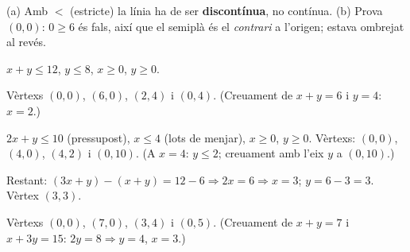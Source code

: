 \begin{solucions}
\begin{sollist}
  \item (a) Amb $<$ (estricte) la línia ha de ser \textbf{discontínua}, no contínua. \quad
        (b) Prova $(0,0)$: $0\ge 6$ és fals, així que el semiplà és el \emph{contrari}
        a l'origen; estava ombrejat al revés.
  \item $x+y\le 12$, \;$y\le 8$, \;$x\ge 0$, \;$y\ge 0$.
  \item Vèrtexs $(0,0)$, $(6,0)$, $(2,4)$ i $(0,4)$. (Creuament de $x+y=6$ i $y=4$:
        $x=2$.)
  \item $2x+y\le 10$ (pressupost), $x\le 4$ (lots de menjar), $x\ge 0$, $y\ge 0$.
        Vèrtexs: $(0,0)$, $(4,0)$, $(4,2)$ i $(0,10)$. (A $x=4$: $y\le 2$;
        creuament amb l'eix $y$ a $(0,10)$.)
  \item Restant: $(3x+y)-(x+y)=12-6\Rightarrow 2x=6\Rightarrow x=3$; $y=6-3=3$. Vèrtex
        $(3,3)$.
  \item Vèrtexs $(0,0)$, $(7,0)$, $(3,4)$ i $(0,5)$. (Creuament de $x+y=7$ i
        $x+3y=15$: $2y=8\Rightarrow y=4$, $x=3$.)
\end{sollist}
\end{solucions}
